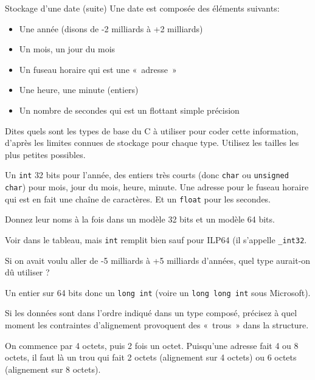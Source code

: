 \begin{exercice}
  \begin{exercicelet}{Stockage d'une date (suite)}
    Une date est composée des éléments suivants:
    \begin{itemize}
    \item Une année (disons de -2 milliards à +2 milliards)
    \item Un mois, un jour du mois
    \item Un fuseau horaire qui est une «~adresse~»
    \item Une heure, une minute (entiers)
    \item Un nombre de secondes qui est un flottant simple précision
    \end{itemize}
    \begin{questions}
    \item Dites quels sont les types de base du C à utiliser pour coder cette
      information, d'après les limites connues de stockage pour chaque
      type. Utilisez les tailles les plus petites possibles.
      \begin{xcorrection}
        Un \texttt{int} 32 bits pour l'année, des entiers très courts (donc
        \texttt{char} ou \texttt{unsigned char}) pour mois, jour du mois,
        heure, minute. Une adresse pour le fuseau horaire qui est en fait une
        chaîne de caractères. Et un \texttt{float} pour les secondes.
      \end{xcorrection}
    \item Donnez leur noms à la fois dans un modèle 32 bits et un modèle 64
      bits.
      \begin{xcorrection}
        Voir dans le tableau, mais \texttt{int} remplit bien sauf pour ILP64
        (il s'appelle \verb|_int32|.
      \end{xcorrection}
    \item Si on avait voulu aller de -5 milliards à +5 milliards d'années,
      quel type aurait-on dû utiliser ?
      \begin{xcorrection}
        Un entier sur 64 bits donc un \texttt{long int} (voire un \texttt{long
          long int} sous Microsoft).
      \end{xcorrection}
    \item Si les données sont dans l'ordre indiqué dans un type composé,
      précisez à quel moment les contraintes d'alignement provoquent des
      «~trous~» dans la structure.
      \begin{xcorrection}
        On commence par 4 octets, puis 2 fois un octet. Puisqu'une adresse
        fait 4 ou 8 octets, il faut là un trou qui fait 2 octets (alignement
        sur 4 octets) ou 6 octets (alignement sur 8 octets).


\end{xcorrection}
\end{questions}
\end{exercicelet}
\end{exercice}
